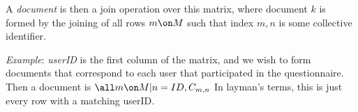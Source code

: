 A \emph{document} is then a join operation over this matrix, where document $k$ is formed by the joining of all rows $m \on M$ such that index $m,n$ is some collective identifier.

\emph{Example}: \emph{userID} is the first column of the matrix, and we wish to form documents that correspond to each user that participated in the questionnaire. Then a document is $\all m \on M | n = ID ,C_{m,n}$ In layman's terms, this is just every row with a matching userID.

